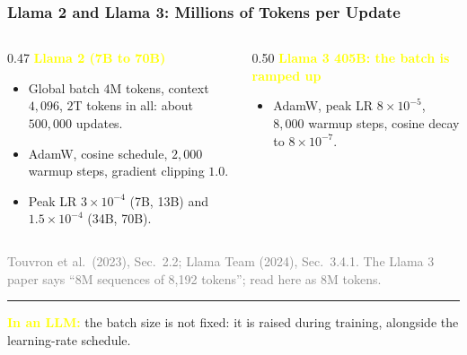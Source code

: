 \documentclass[12pt]{beamer}
\newcommand{\FrameTitle}[2]{\frametitle{#1 \hfill \small\textnormal{\textcolor{midgray}{#2}}}}
\begin{document}
\begin{frame}\FrameTitle{Llama 2 and Llama 3: Millions of Tokens per Update}{}
\vspace*{-3mm}
\begin{columns}[T]
\begin{column}{0.47\linewidth}
  \textcolor{yellow}{\textbf{Llama 2 (7B to 70B)}}
  \begin{itemize}\footnotesize\setlength{\itemsep}{1.2mm}
    \item Global batch $4$M tokens, context $4{,}096$, $2$T tokens in all: about $500{,}000$ updates.
    \item AdamW, cosine schedule, $2{,}000$ warmup steps, gradient clipping $1.0$.
    \item Peak LR $3\times10^{-4}$ (7B, 13B) and $1.5\times10^{-4}$ (34B, 70B).
  \end{itemize}
\end{column}
\begin{column}{0.50\linewidth}
  \textcolor{yellow}{\textbf{Llama 3 405B: the batch is ramped up}}
  \vspace{1mm}
  \vspace*{-2mm}
  \begin{itemize}\footnotesize\setlength{\itemsep}{1.2mm}
    \item AdamW, peak LR $8\times10^{-5}$, $8{,}000$ warmup steps, cosine decay to $8\times10^{-7}$.
  \end{itemize}
\end{column}
\end{columns}
{\par\vspace{2mm}\footnotesize\textcolor{gray}
    {Touvron et al.\ (2023), Sec.\ 2.2; Llama Team (2024),
     Sec.\ 3.4.1. The Llama 3 paper says ``8M sequences
     of 8,192 tokens''; read here as $8$M tokens.}\par}
\vspace*{-3mm}
{\color{yellow}\rule{\linewidth}{0.5pt}}\par\vspace{1mm}
{\raggedright\small\textcolor{yellow}{\textbf{In an LLM:}}
    the batch size is not fixed: it is raised during training,
    alongside the learning-rate schedule.\par}
\end{frame}
\end{document}
